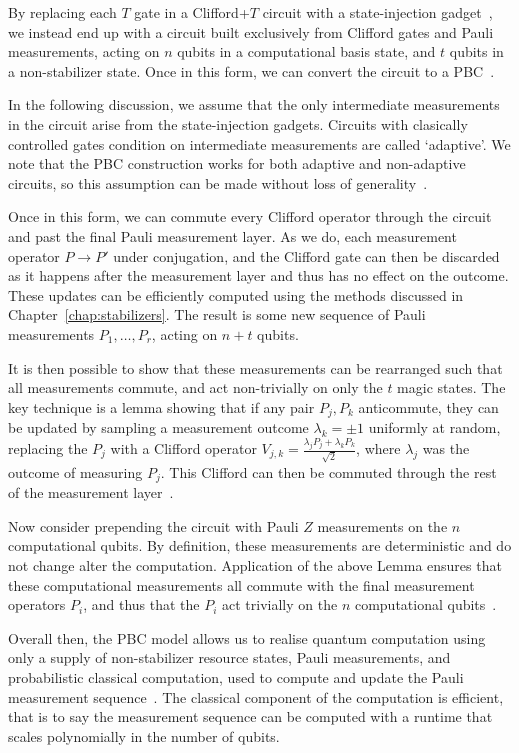 By replacing each $T$ gate in a Clifford+$T$ circuit with a state-injection gadget~\cite{Bravyi2005}, we instead end up with a circuit built exclusively from Clifford gates and Pauli measurements, acting on $n$ qubits in a computational basis state, and $t$ qubits in a non-stabilizer state. Once in this form, we can convert the circuit to a PBC~\cite{Bravyi2015,Yoganathan2019}.\par
In the following discussion, we assume that the only intermediate measurements in the circuit arise from the state-injection gadgets. Circuits with clasically controlled gates condition on intermediate measurements are called `adaptive'. We note that the PBC construction works for both adaptive and non-adaptive circuits, so this assumption can be made without loss of generality~\cite{Bravyi2015,Yoganathan2019}.\par
Once in this form, we can commute every Clifford operator through the circuit and past the final Pauli measurement layer. As we do,  each measurement operator $P\rightarrow P'$ under conjugation, and the Clifford gate can then be discarded as it happens after the measurement layer and thus has no effect on the outcome. These updates can be efficiently computed using the methods discussed in Chapter~\ref{chap:stabilizers}. The result is some new sequence of Pauli measurements $P_{1},\dots,P_{r}$, acting on $n+t$ qubits.\par
It is then possible to show that these measurements can be rearranged such that all measurements commute, and  act non-trivially on only the $t$ magic states. The key technique is a lemma showing that if any pair $P_{j},P_{k}$ anticommute, they can be updated by sampling a measurement outcome $\lambda_{k}=\pm1$ uniformly at random, replacing the $P_{j}$ with a Clifford operator $V_{j,k}=\frac{\lambda_{j}P_{j}+\lambda_{k}P_{k}}{\sqrt{2}}$, where $\lambda_{j}$ was the outcome of measuring $P_{j}$. This Clifford can then be commuted through the rest of the measurement layer~\cite{Yoganathan2019}.\par
Now consider prepending the circuit with Pauli $Z$ measurements on the $n$ computational qubits. By definition, these measurements are deterministic and do not change alter the computation. Application of the above Lemma ensures that these computational measurements all commute with the final measurement operators $P_{i}$, and thus that the $P_{i}$ act trivially on the $n$ computational qubits~\cite{Bravyi2015}.\par
Overall then, the PBC model allows us to realise quantum computation using only a supply of non-stabilizer resource states, Pauli measurements, and probabilistic classical computation, used to compute and update the Pauli measurement sequence~\cite{Yoganathan2019}. The classical component of the computation is efficient, that is to say the measurement sequence can be computed with a runtime that scales polynomially in the number of qubits.\par

